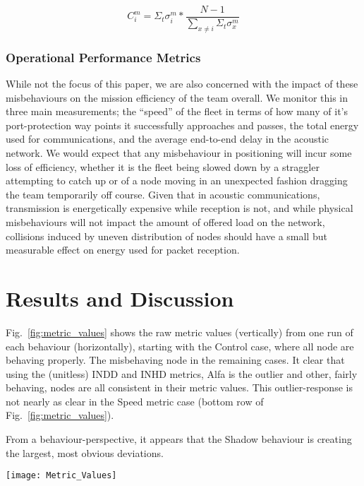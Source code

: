 \begin{equation}
  C_{i}^{m} = \Sigma_t\sigma_{i}^m * \frac{N-1}{\sum_{x\neq i}{\Sigma_t\sigma_{x}^m}}\label{eq:confidence}
\end{equation}

\subsubsection{Operational Performance Metrics}
While not the focus of this paper, we are also concerned with the impact of these misbehaviours on the mission efficiency of the team overall.
We monitor this in three main measurements; the ``speed'' of the fleet in terms of how many of it's port-protection way points it successfully approaches and passes, the total energy used for communications, and the average end-to-end delay in the acoustic network.
We would expect that any misbehaviour in positioning will incur some loss of efficiency, whether it is the fleet being slowed down by a straggler attempting to catch up or of a node moving in an unexpected fashion dragging the team temporarily off course.
Given that in acoustic communications, transmission is energetically expensive while reception is not, and while physical misbehaviours will not impact the amount of offered load on the network, collisions induced by uneven distribution of nodes should have a small but measurable effect on energy used for packet reception.

\section{Results and Discussion}
Fig.~\ref{fig:metric_values} shows the raw metric values (vertically) from one run of each behaviour (horizontally), starting with the Control case, where all node are behaving properly.
The misbehaving node in the remaining cases.
It clear that using the (unitless) INDD and INHD metrics, Alfa is the outlier and other, fairly behaving, nodes are all consistent in their metric values.
This outlier-response is not nearly as clear in the Speed metric case (bottom row of Fig.~\ref{fig:metric_values}).

From a behaviour-perspective, it appears that the Shadow behaviour is creating the largest, most obvious deviations.

\begin{figure*}
  \centering
  \texttt{[image: Metric\_Values]}
  \caption{Observed Metric Values for one simulation of each behaviour ($x_{i,j}^{m,t}$ from \eqref{eq:d})}
  \label{fig:metric_values}
\end{figure*}

